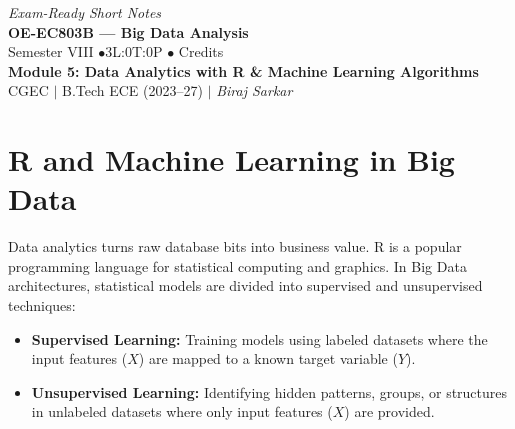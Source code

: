 \documentclass[12pt,a4paper]{article}
\begin{document}
\begin{center}
  \hfill \textit{Exam-Ready Short Notes} \\
  \vspace{6pt}
  {\LARGE\bfseries\color{myred} OE-EC803B --- Big Data Analysis}\\[5pt]
  {\normalsize\color{mydark} Semester VIII \quad$\bullet$\quad 3L:0T:0P \quad$\bullet$ Credits}\\[3pt]
  {\normalsize\color{myteal}\textbf{Module 5: Data Analytics with R \& Machine Learning Algorithms}}\\[3pt]
  {\small\color{mydark} CGEC \;$|$\; B.Tech ECE (2023--27) \;$|$\; \textit{Biraj Sarkar}}
\end{center}
\vspace{2pt}
\noindent{\color{myred}\rule{\linewidth}{1.5pt}}
\vspace{2pt}

\hypersetup{linkcolor=mydark}
\tableofcontents
\hypersetup{linkcolor=myteal}
\newpage

\section{R and Machine Learning in Big Data}

Data analytics turns raw database bits into business value. R is a popular programming language for statistical computing and graphics. In Big Data architectures, statistical models are divided into supervised and unsupervised techniques:

\begin{tcolorbox}[defbox, title={Machine Learning Paradigms}]
  \begin{itemize}[leftmargin=*, itemsep=3pt]
    \item \textbf{Supervised Learning:} Training models using labeled datasets where the input features ($X$) are mapped to a known target variable ($Y$).
    \item \textbf{Unsupervised Learning:} Identifying hidden patterns, groups, or structures in unlabeled datasets where only input features ($X$) are provided.
  \end{itemize}
\end{tcolorbox}
\end{document}
